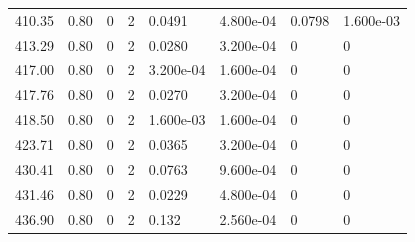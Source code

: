 \documentclass[preview]{standalone}
\begin{document}
{{{\begin{tabular}{L{1.2cm}C{1.2cm} C{0.3cm}C{0.5cm} C{1.4cm}C{1.4cm} C{1.4cm}C{1.4cm}}
  410.35  &  0.80  & 0     &  2 &  0.0491  & 4.800e-04  & 0.0798 &  1.600e-03   \\ 
  413.29  &  0.80  & 0     &  2 &  0.0280  & 3.200e-04  & 0 &  0   \\ 
  417.00  &  0.80  & 0     &  2 &  3.200e-04  & 1.600e-04  & 0 &  0   \\ 
  417.76  &  0.80  & 0     &  2 &  0.0270  & 3.200e-04  & 0 &  0   \\ 
  418.50  &  0.80  & 0     &  2 &  1.600e-03  & 1.600e-04  & 0 &  0   \\ 
  423.71  &  0.80  & 0     &  2 &  0.0365  & 3.200e-04  & 0 &  0   \\ 
  430.41  &  0.80  & 0     &  2 &  0.0763  & 9.600e-04  & 0 &  0   \\ 
  431.46  &  0.80  & 0     &  2 &  0.0229  & 4.800e-04  & 0 &  0   \\ 
  436.90  &  0.80  & 0     &  2 &  0.132  & 2.560e-04  & 0 &  0   \\ 
\hline 
\end{tabular} 

}}}
\end{document}
